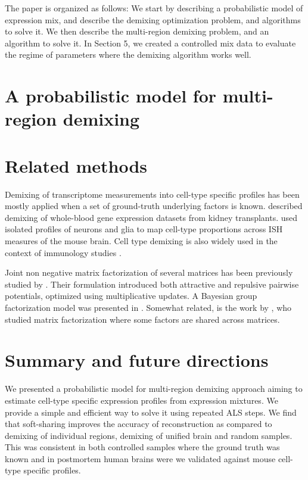 \documentclass{article} %
\begin{document}
The paper is organized as follows: We start by describing a probabilistic model of expression mix, and describe the demixing optimization problem, and algorithms to solve it. We then describe the multi-region demixing problem, and an algorithm to solve it. In Section 5, we created a controlled mix data to evaluate the regime of parameters where the demixing algorithm works well. 

\section{A probabilistic model for multi-region demixing}


\section{Related methods}
Demixing of transcriptome measurements into cell-type specific profiles has been mostly applied when a set of ground-truth underlying factors is known. \citet{shen2010cell} described demixing of 
whole-blood gene expression datasets from kidney transplants. \citet{grange2014cell} used isolated profiles of neurons and glia \cite{okaty2011cell} to map cell-type proportions across ISH measures of the mouse brain. Cell type demixing is also widely used in the context of immunology studies \cite{shen2013computational}.

Joint non negative matrix factorization of several matrices has been previously studied by \citet{lee2009group}. Their formulation introduced  both attractive and repulsive pairwise potentials, optimized using multiplicative updates. A Bayesian group factorization model was presented in \citet{shin2012bayesian}. Somewhat related, is the work by \citet{wang2012group}, who studied matrix factorization where some factors are shared across matrices.






\section{Summary and future directions}
We presented a probabilistic model for multi-region demixing approach aiming to estimate cell-type specific expression profiles from expression mixtures. We provide a simple and efficient way to solve it using repeated ALS steps. We find that soft-sharing improves the accuracy of reconstruction as compared to demixing of individual regions, demixing of unified brain and random samples. This was consistent in both controlled samples where the ground truth was known and in postmortem human brains were we validated against mouse cell-type specific profiles.
\end{document}
